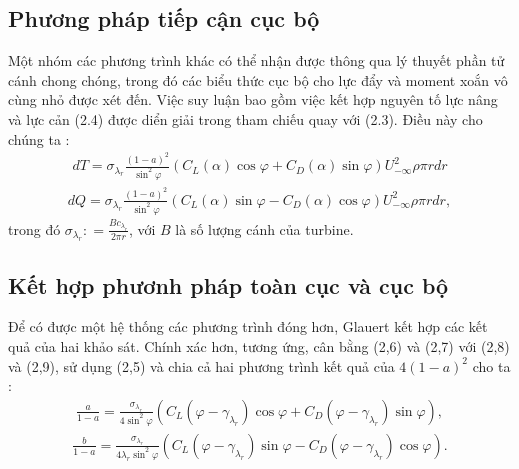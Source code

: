 \documentclass[a4paper,twoside,13pt]{extbook}
\begin{document}
\subsection{Phương pháp tiếp cận cục bộ}
Một nhóm các phương trình khác có thể nhận được thông qua lý thuyết phần tử cánh chong chóng, trong đó các biểu thức cục bộ cho lực đẩy và moment xoắn vô cùng nhỏ được xét đến. Việc suy luận bao gồm việc kết hợp nguyên tố lực nâng và lực cản (2.4) được diển giải trong tham chiếu quay với (2.3). Điều này cho chúng ta :
\begin{equation}\label{eq:1_9}
    \begin{aligned}
        dT = {\sigma _{{\lambda _r}}}\frac{{{{\left( {1 - a} \right)}^2}}}{{{{\sin }^2}\varphi }}\left( {{C_L}\left( \alpha  \right)\cos \varphi  + {C_D}\left( \alpha  \right)\sin \varphi } \right)U_{ - \infty }^2\rho \pi rdr
    \end{aligned}
\end{equation}
\begin{equation}\label{eq:1_10}
    \begin{aligned}
        dQ = {\sigma _{{\lambda _r}}}\frac{{{{\left( {1 - a} \right)}^2}}}{{{{\sin }^2}\varphi }}\left( {{C_L}\left( \alpha  \right)\sin \varphi  - {C_D}\left( \alpha  \right)\cos \varphi } \right)U_{ - \infty }^2\rho \pi rdr,
    \end{aligned}
\end{equation}
trong đó $\displaystyle{\sigma _{{\lambda _r}}}: = \frac{{B{c_{{\lambda _r}}}}}{{2\pi r}}$, với $B$ là số lượng cánh của turbine.
\subsection{Kết hợp phươnh pháp toàn cục và cục bộ}
Để có được một hệ thống các phương trình đóng hơn, Glauert kết hợp các kết quả của hai khảo sát. Chính xác hơn, tương ứng, cân bằng (2,6) và (2,7) với (2,8) và (2,9), sử dụng (2,5) và chia cả hai phương trình kết quả của $4 (1 - a)^2$ cho ta :
\begin{equation}\label{eq:1_11}
    \begin{aligned}
        \frac{a}{{1 - a}} = \frac{{{\sigma _{{\lambda _r}}}}}{{4{{\sin }^2}\varphi }}\left( {{C_L}\left( {\varphi  - {\gamma _{{\lambda _r}}}} \right)\cos \varphi  + {C_D}\left( {\varphi  - {\gamma _{{\lambda _r}}}} \right)\sin \varphi } \right),
    \end{aligned}
\end{equation}
\begin{equation}\label{eq:1_12}
    \begin{aligned}
        \frac{b}{{1 - a}} = \frac{{{\sigma _{{\lambda _r}}}}}{{4{\lambda _r}{{\sin }^2}\varphi }}\left( {{C_L}\left( {\varphi  - {\gamma _{{\lambda _r}}}} \right)\sin \varphi  - {C_D}\left( {\varphi  - {\gamma _{{\lambda _r}}}} \right)\cos \varphi } \right).
    \end{aligned}
\end{equation}
\end{document}
